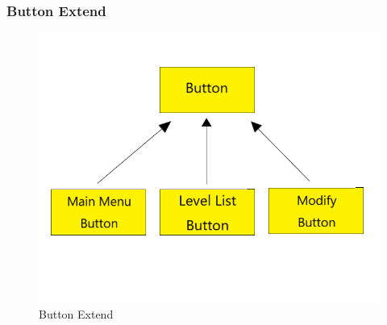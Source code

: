 \subsubsection{Button Extend}

\begin{figure}[H]
\graphicspath{{pic/}}
\includegraphics[scale=0.5]{button.png}
\caption{Button Extend}
\vskip 0pt
\end{figure}
